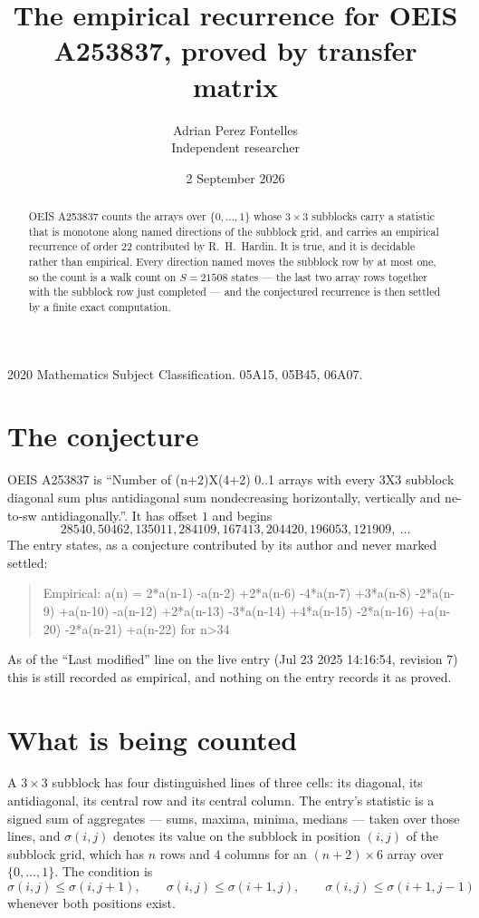 \documentclass[11pt,a4paper]{article}
\title{The empirical recurrence for OEIS A253837, proved by transfer matrix}
\author{Adrian Perez Fontelles\\ \small Independent researcher}
\date{2 September 2026}
\theoremstyle{plain}
\theoremstyle{definition}
\begin{document}
\maketitle

\begin{abstract}
OEIS A253837 counts the arrays over $\{0,\dots,1\}$ whose $3\times3$ subblocks carry a
statistic that is monotone along named directions of the subblock grid, and carries an
empirical recurrence of order $22$ contributed by R.~H.~Hardin. It is true, and it is
decidable rather than empirical. Every direction named moves the subblock row by at most one,
so the count is a walk count on $S=21508$ states --- the last two array rows together with the
subblock row just completed --- and the conjectured recurrence is then settled by a finite
exact computation.
\end{abstract}

\noindent\small 2020 Mathematics Subject Classification. 05A15, 05B45, 06A07.\normalsize

\section{The conjecture}

OEIS A253837 is ``Number of (n+2)X(4+2) 0..1 arrays with every 3X3 subblock diagonal sum plus antidiagonal sum nondecreasing horizontally, vertically and ne-to-sw antidiagonally.''. It has offset $1$ and begins
\[
28540, 50462, 135011, 284109, 167413, 204420, 196053, 121909,\ \dots
\]
The entry states, as a conjecture contributed by its author and never marked settled:
\begin{quote}
Empirical: a(n) = 2*a(n-1) -a(n-2) +2*a(n-6) -4*a(n-7) +3*a(n-8) -2*a(n-9) +a(n-10) -a(n-12) +2*a(n-13) -3*a(n-14) +4*a(n-15) -2*a(n-16) +a(n-20) -2*a(n-21) +a(n-22) for n>34
\end{quote}
As of the ``Last modified'' line on the live entry (Jul 23 2025 14:16:54, revision 7) this is still
recorded as empirical, and nothing on the entry records it as proved.

\section{What is being counted}

A $3\times3$ subblock has four distinguished lines of three cells: its diagonal, its
antidiagonal, its central row and its central column. The entry's statistic is a signed sum of
aggregates --- sums, maxima, minima, medians --- taken over those lines, and $\sigma(i,j)$
denotes its value on the subblock in position $(i,j)$ of the subblock grid, which has $n$ rows
and $4$ columns for an $(n+2)\times6$ array over $\{0,\dots,1\}$. The condition is
\[
\sigma(i,j)\le\sigma(i,j+1),\qquad \sigma(i,j)\le\sigma(i+1,j),\qquad \sigma(i,j)\le\sigma(i+1,j-1)
\]
whenever both positions exist.
\end{document}
